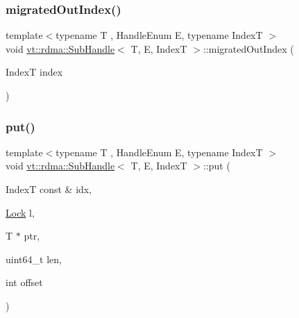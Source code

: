 \mbox{\label{structvt_1_1rdma_1_1_sub_handle_a6723f3d3ff525c3fd8aaca76f781c95d}} 
\subsubsection{\texorpdfstring{migrated\+Out\+Index()}{migratedOutIndex()}}
{\footnotesize\ttfamily template$<$typename T , Handle\+Enum E, typename IndexT $>$ \\
void \hyperlink{structvt_1_1rdma_1_1_sub_handle}{vt\+::rdma\+::\+Sub\+Handle}$<$ T, E, IndexT $>$\+::migrated\+Out\+Index (\begin{DoxyParamCaption}\item[{IndexT}]{index }\end{DoxyParamCaption})}

\mbox{\label{structvt_1_1rdma_1_1_sub_handle_a2e485242951ffe40f56dade64719c423}} 
\subsubsection{\texorpdfstring{put()}{put()}}
{\footnotesize\ttfamily template$<$typename T , Handle\+Enum E, typename IndexT $>$ \\
void \hyperlink{structvt_1_1rdma_1_1_sub_handle}{vt\+::rdma\+::\+Sub\+Handle}$<$ T, E, IndexT $>$\+::put (\begin{DoxyParamCaption}\item[{IndexT const \&}]{idx,  }\item[{\hyperlink{namespacevt_1_1rdma_ac5c20b41a653e520b6305d4d454ecb70}{Lock}}]{l,  }\item[{T $\ast$}]{ptr,  }\item[{uint64\+\_\+t}]{len,  }\item[{int}]{offset }\end{DoxyParamCaption})}

\mbox{\label{structvt_1_1rdma_1_1_sub_handle_a83e0f67ca1cbbaeb729c5a4871548023}} 
